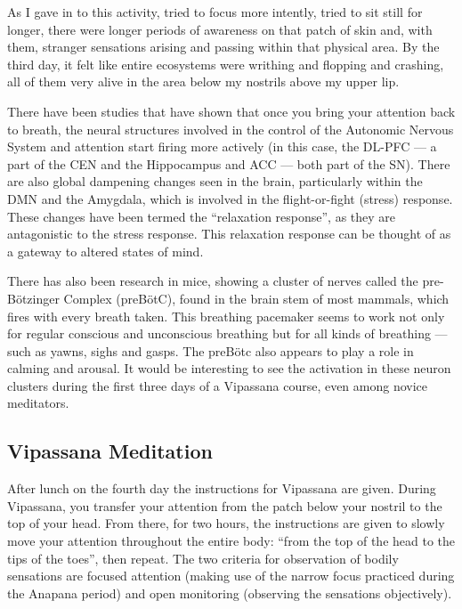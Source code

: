 \documentclass[twocolumn]{article}
\begin{document}
As I gave in to this activity, tried to focus more intently, tried to sit still for
longer, there were longer periods of awareness on that patch of skin and, with them,
stranger sensations arising and passing within that physical area. By the third day,
it felt like entire ecosystems were writhing and flopping and crashing, all of them
very alive in the area below my nostrils above my upper lip.

There have been studies
that have shown that once you bring your attention back to breath, the neural
structures involved in the control of the Autonomic Nervous System and attention
start firing more actively (in this case, the DL-PFC --- a part of the CEN and the
Hippocampus and ACC --- both part of the SN). There are also global dampening changes
seen in the brain, particularly within the DMN and the Amygdala, which is involved in
the flight-or-fight (stress) response. These changes have been
termed the ``relaxation response'', as they are antagonistic to the stress
response. This relaxation response can be thought of as a gateway to altered states
of mind. \cite{relaxationresponse}

There has also been research in mice, showing a cluster of nerves called the
pre-Bötzinger Complex (preBötC), found in the brain stem of most mammals, which fires
with every breath taken. This breathing pacemaker seems to work not only for regular
conscious and unconscious breathing but for all kinds of breathing --- such as yawns,
sighs and gasps. The preBötc also appears to play a role in calming and
arousal. \cite{prebotcgeneration} It would be interesting to see the activation in
these neuron clusters during the first three days of a Vipassana course, even among
novice meditators.

\subsection{Vipassana Meditation}

After lunch on the fourth day the instructions for Vipassana are given. During
Vipassana, you transfer your attention from the patch below your nostril to the top
of your head. From there, for two hours, the instructions are given to slowly move
your attention throughout the entire body: ``from the top of the head to the tips of
the toes'', then repeat. The two criteria for observation of bodily sensations are
focused attention (making use of the narrow focus practiced during the Anapana
period) and open monitoring (observing the sensations objectively).
\end{document}
